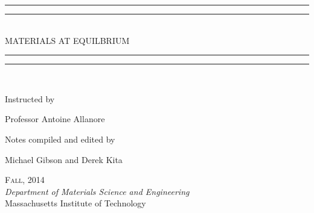\documentclass[11pt]{report}
\newlength{\drop}
\begin{document}
  \begin{titlepage}
    \textheight
    \centering
    \vspace*{\baselineskip}
    \rule{\textwidth}{1.6pt}\vspace*{-\baselineskip}\vspace*{2pt}
    \rule{\textwidth}{0.4pt}\\[\baselineskip]
    {\LARGE MATERIALS AT EQUILBRIUM}\\[0.2\baselineskip]
    \rule{\textwidth}{0.4pt}\vspace*{-\baselineskip}\vspace{3.2pt}
    \rule{\textwidth}{1.6pt}\\[\baselineskip]
    \scshape

    \vspace*{2\baselineskip}
    Instructed by \\
    {\Large Professor Antoine Allanore\par} \vspace{2 em}
    \vfill
    Notes compiled and edited by\\
    {\Large Michael Gibson and Derek Kita \par} \vspace{2 em}
    {\scshape Fall, 2014} \\
    {\itshape  Department of Materials Science and Engineering \vspace*{0 em}}\\
    {\large Massachusetts Institute of Technology}\par
  \end{titlepage}
\end{document}
